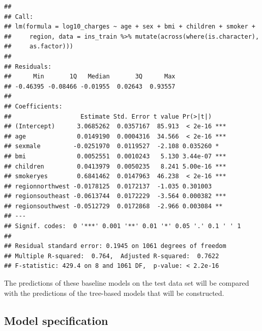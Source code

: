 \documentclass[
]{book}
\begin{document}
\begin{verbatim}
## 
## Call:
## lm(formula = log10_charges ~ age + sex + bmi + children + smoker + 
##     region, data = ins_train %>% mutate(across(where(is.character), 
##     as.factor)))
## 
## Residuals:
##      Min       1Q   Median       3Q      Max 
## -0.46395 -0.08466 -0.01955  0.02643  0.93557 
## 
## Coefficients:
##                   Estimate Std. Error t value Pr(>|t|)    
## (Intercept)      3.0685262  0.0357167  85.913  < 2e-16 ***
## age              0.0149190  0.0004316  34.566  < 2e-16 ***
## sexmale         -0.0251970  0.0119527  -2.108 0.035260 *  
## bmi              0.0052551  0.0010243   5.130 3.44e-07 ***
## children         0.0413979  0.0050235   8.241 5.00e-16 ***
## smokeryes        0.6841462  0.0147963  46.238  < 2e-16 ***
## regionnorthwest -0.0178125  0.0172137  -1.035 0.301003    
## regionsoutheast -0.0613744  0.0172229  -3.564 0.000382 ***
## regionsouthwest -0.0512729  0.0172868  -2.966 0.003084 ** 
## ---
## Signif. codes:  0 '***' 0.001 '**' 0.01 '*' 0.05 '.' 0.1 ' ' 1
## 
## Residual standard error: 0.1945 on 1061 degrees of freedom
## Multiple R-squared:  0.764,  Adjusted R-squared:  0.7622 
## F-statistic: 429.4 on 8 and 1061 DF,  p-value: < 2.2e-16
\end{verbatim}

The predictions of these baseline models on the test data set will be compared with the predictions of the tree-based models that will be constructed.

\hypertarget{model-specification-1}{%
\subsection{Model specification}\label{model-specification-1}}
\end{document}
